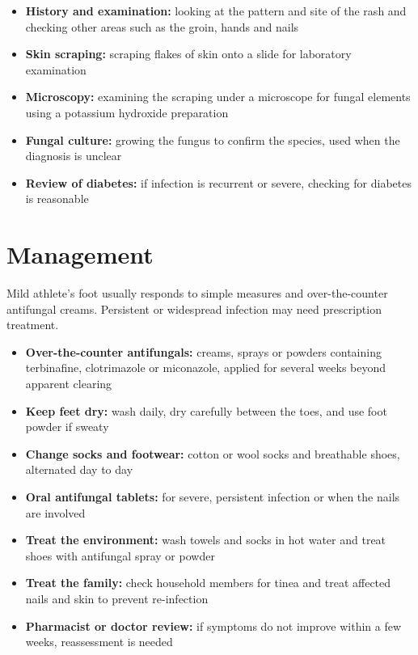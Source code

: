 \begin{itemize}
    \item \textbf{History and examination:} looking at the pattern and site of the rash and checking other areas such as the groin, hands and nails
    \item \textbf{Skin scraping:} scraping flakes of skin onto a slide for laboratory examination
    \item \textbf{Microscopy:} examining the scraping under a microscope for fungal elements using a potassium hydroxide preparation
    \item \textbf{Fungal culture:} growing the fungus to confirm the species, used when the diagnosis is unclear
    \item \textbf{Review of diabetes:} if infection is recurrent or severe, checking for diabetes is reasonable
\end{itemize}

\section*{Management}
Mild athlete's foot usually responds to simple measures and over-the-counter antifungal creams. Persistent or widespread infection may need prescription treatment.

\begin{itemize}
    \item \textbf{Over-the-counter antifungals:} creams, sprays or powders containing terbinafine, clotrimazole or miconazole, applied for several weeks beyond apparent clearing
    \item \textbf{Keep feet dry:} wash daily, dry carefully between the toes, and use foot powder if sweaty
    \item \textbf{Change socks and footwear:} cotton or wool socks and breathable shoes, alternated day to day
    \item \textbf{Oral antifungal tablets:} for severe, persistent infection or when the nails are involved
    \item \textbf{Treat the environment:} wash towels and socks in hot water and treat shoes with antifungal spray or powder
    \item \textbf{Treat the family:} check household members for tinea and treat affected nails and skin to prevent re-infection
    \item \textbf{Pharmacist or doctor review:} if symptoms do not improve within a few weeks, reassessment is needed
\end{itemize}

